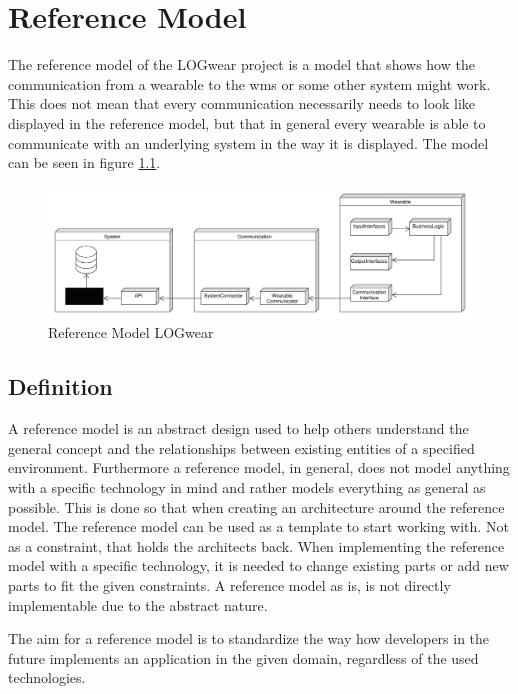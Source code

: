 \chapter{Reference Model}\label{cha:reference}
The \gls{reference model} of the LOGwear project is a model that shows how the communication from a wearable to the \gls{wms} or some other system might work. This does not mean that every communication necessarily needs to look like displayed in the \gls{reference model}, but that in general every wearable is able to communicate with an underlying system in the way it is displayed.
The model can be seen in figure \ref{fig:referenceModel}.
\begin{figure}[htbp]
	\includegraphics[width=\linewidth]{images/PackageModel_ReferenceArchitecture}
	\caption{Reference Model LOGwear}
	\label{fig:referenceModel}
\end{figure}

\section{Definition}
A \gls{reference model} is an abstract design used to help others understand the general concept and the relationships between existing entities of a specified environment. Furthermore a \gls{reference model}, in general, does not model anything with a specific technology in mind and rather models everything as general as possible. This is done so that when creating an architecture around the \gls{reference model}. The \gls{reference model} can be used as a template to start working with. Not as a constraint, that holds the architects back. When implementing the \gls{reference model} with a specific technology, it is needed to change existing parts or add new parts to fit the given constraints. A \gls{reference model} as is, is not directly implementable due to the abstract nature.

The aim for a \gls{reference model} is to standardize the way how developers in the future implements an application in the given domain, regardless of the used technologies.\cite{website:oasis-rm}

